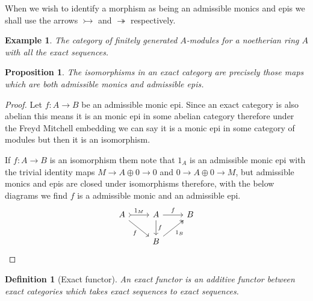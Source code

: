 \documentclass[12pt]{report}
\numberwithin{equation}{section}
\newtheorem{definition}[dummy]{Definition}
\newtheorem{proposition}[dummy]{Proposition}
\newtheorem{example}[dummy]{Example}
\begin{document}
		When we wish to identify a morphism as being an admissible monics and epis we shall use the arrows \( \rightarrowtail \) and \( \twoheadrightarrow \) respectively.
		
	
		
		
		\begin{example}The category of finitely generated \(A\)-modules for a noetherian ring \(A\) with all the exact sequences.
		\end{example}
	
		
		\begin{proposition}\label{prop:isoinexact}
			The isomorphisms in an exact category are precisely those maps which are both admissible monics and admissible epis.
		\end{proposition}
		\begin{proof}
			Let $f: A \to B$ be an admissible monic epi. Since an exact category is also abelian this means it is an monic epi in some abelian category therefore under the Freyd Mitchell embedding we can say it is a monic epi in some category of modules but then it is an isomorphism.
			
			If $f: A \to B$ is an isomorphism them note that $1_A$ is an admissible monic epi with the trivial identity maps $M \to A \oplus 0 \to 0$ and $0 \to A \oplus 0 \to M$, but admissible monics and epis are closed under isomorphisms therefore, with the below diagrams we find $f $ is a admissible monic and an admissible epi.
				\[\begin{tikzcd}
				A & A & B \\
				& B
				\arrow["{1_M}", tail, from=1-1, to=1-2]
				\arrow["f"', from=1-1, to=2-2]
				\arrow["f", from=1-2, to=1-3]
				\arrow["f", from=1-2, to=2-2]
				\arrow["{1_B}"', two heads, from=2-2, to=1-3]
			\end{tikzcd}\]
		\end{proof}
		\begin{definition}[Exact functor]
			An exact functor is an additive functor between exact categories which takes exact sequences to exact sequences.
		\end{definition}
		
		
\end{document}
